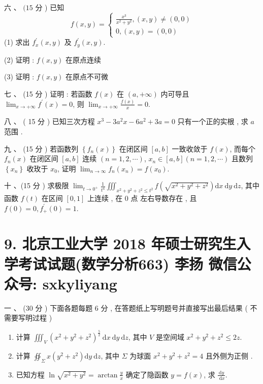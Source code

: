 \documentclass[10pt]{article}
\begin{document}
{ 六 、 $(15$  分 )  已知 
$$
f(x, y)=\left\{\begin{array}{l}
\frac{x^{3}}{x^{2}+y^{2}},(x, y) \neq(0,0) \\
0,(x, y)=(0,0)
\end{array}\right.
$$
(1)  求出  $f_{x}^{\prime}(x, y)$  及  $f_{y}^{\prime}(x, y)$.

(2)  证明 : $f(x, y)$  在原点连续 

(3)  证明 : $f(x, y)$  在原点不可微 

 七 、 (15  分 )  证明 :  若函数  $f(x)$  在  $(a,+\infty)$  内可导且  $\lim _{x \rightarrow+\infty} f^{\prime}(x)=0$,  则  $\lim _{x \rightarrow+\infty} \frac{f(x)}{x}=0$.

 八 、 ( 15  分 )  已知三次方程  $x^{3}-3 a^{2} x-6 a^{2}+3 a=0$  只有一个正的实根 ,  求  $a$  范围 .

 九 、 (15  分 )  若函数列  $\left\{f_{n}(x)\right\}$  在闭区间  $[a, b]$  一致收敛于  $f(x)$,  而每个  $f_{n}(x)$  在闭区间  $[a, b]$  连续  $(n=1,2, \cdots)$, $x_{n} \in[a, b](n=1,2, \cdots)$  且数列  $\left\{x_{n}\right\}$  收玫于  $x_{0}$,  证明  $\lim _{n \rightarrow \infty} f_{n}\left(x_{n}\right)=f\left(x_{0}\right)$.

 十 、(15  分 )  求极限  $\lim _{t \rightarrow 0^{+}} \frac{1}{t^{4}} \iiint_{x^{2}+y^{2}+z^{2} \leq t^{2}} f\left(\sqrt{x^{2}+y^{2}+z^{2}}\right) \mathrm{d} x \mathrm{~d} y \mathrm{~d} z$,  其中函数  $f(t)$  在区间  $[0,1]$  上连续 ,  在  0  点   左右导数存在 ,  且  $f(0)=0, f_{+}^{\prime}(0)=1$.

\section{9. 北京工业大学 2018 年硕士研究生入学考试试题(数学分析663) 
 李扬 
 微信公众号: sxkyliyang}
 一 、 (30  分 )  下面各题每题  6  分 ,  在答题纸上写明题号并直接写出最后结果 ( 不需要写明过程 )

\begin{enumerate}
  \item  计算  $\iiint_{V}\left(x^{2}+y^{2}+z^{2}\right)^{\frac{5}{2}} \mathrm{~d} x \mathrm{~d} y \mathrm{~d} z$,  其中  $V$  是空间域  $x^{2}+y^{2}+z^{2} \leq 2 z$.

  \item  计算  $\oiint_{\Sigma} x\left(y^{2}+z^{2}\right) \mathrm{d} y \mathrm{~d} z$,  其中  $\Sigma$  为球面  $x^{2}+y^{2}+z^{2}=4$  且外侧为正侧 .

  \item  已知方程  $\ln \sqrt{x^{2}+y^{2}}=\arctan \frac{y}{x}$  确定了隐函数  $y=f(x)$,  求  $\frac{\mathrm{d} y}{\mathrm{~d} x}$.


\end{enumerate}}
\end{document}
